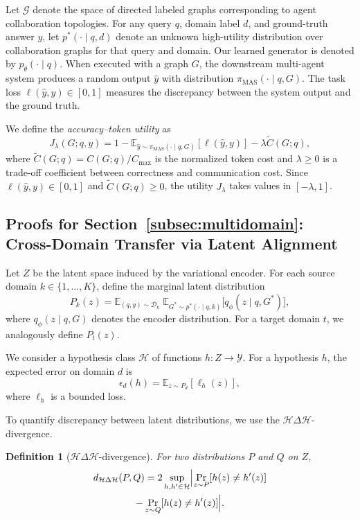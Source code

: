 \documentclass[lettersize,journal]{IEEEtran}
\theoremstyle{plain}
\newtheorem{definition}[theorem]{Definition}
\begin{document}
Let $\mathcal{G}$ denote the space of directed labeled graphs corresponding to agent collaboration topologies. For any query $q$, domain label $d$, and ground-truth answer $y$, let $p^*(\cdot \mid q, d)$ denote an unknown high-utility distribution over collaboration graphs for that query and domain. Our learned generator is denoted by $p_\theta(\cdot \mid q)$. When executed with a graph $G$, the downstream multi-agent system produces a random output $\hat{y}$ with distribution $\pi_{\mathrm{MAS}}(\cdot \mid q, G)$. The task loss $\ell(\hat{y}, y) \in [0,1]$ measures the discrepancy between the system output and the ground truth.

We define the \emph{accuracy--token utility} as
\[
J_\lambda(G; q, y)
=
1
-
\mathbb{E}_{\hat{y}\sim\pi_{\mathrm{MAS}}(\cdot \mid q, G)}[\ell(\hat{y}, y)]
-
\lambda \widetilde{C}(G; q),
\]
where $\widetilde{C}(G; q) = C(G; q)/C_{\max}$ is the normalized token cost and $\lambda \ge 0$ is a trade-off coefficient between correctness and communication cost. Since $\ell(\hat{y}, y)\in[0,1]$ and $\widetilde{C}(G; q)\ge 0$, the utility $J_\lambda$ takes values in $[-\lambda,1]$.

\subsection{Proofs for Section~\ref{subsec:multidomain}: Cross-Domain Transfer via Latent Alignment}
\label{app:multidomain}

Let $Z$ be the latent space induced by the variational encoder. For each source domain $k \in \{1,\dots,K\}$, define the marginal latent distribution
\[
P_k(z)
=
\mathbb{E}_{(q,y)\sim\mathcal{D}_k}
\;
\mathbb{E}_{G^* \sim p^*(\cdot \mid q,k)}
\bigl[q_\phi(z \mid q, G^*)\bigr],
\]
where $q_\phi(z \mid q, G)$ denotes the encoder distribution. For a target domain $t$, we analogously define $P_t(z)$.

We consider a hypothesis class $\mathcal{H}$ of functions $h: Z \to \mathcal{Y}$. For a hypothesis $h$, the expected error on domain $d$ is
\[
\epsilon_d(h) = \mathbb{E}_{z \sim P_d}[\ell_h(z)],
\]
where $\ell_h$ is a bounded loss.

To quantify discrepancy between latent distributions, we use the $\mathcal{H}\Delta\mathcal{H}$-divergence.

\begin{definition}[$\mathcal{H}\Delta\mathcal{H}$-divergence]
\label{def:hdiv}
For two distributions $P$ and $Q$ on $Z$,
\begin{multline*}
d_{\mathcal{H}\Delta\mathcal{H}}(P,Q)
=
2\sup_{h,h'\in\mathcal{H}}
\Bigl|
\Pr_{z\sim P}[h(z)\neq h'(z)] \\
- \Pr_{z\sim Q}[h(z)\neq h'(z)]
\Bigr|.
\end{multline*}
\end{definition}
\end{document}
